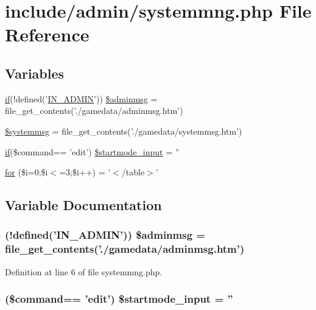 \hypertarget{systemmng_8php}{\section{include/admin/systemmng.php File Reference}
\label{systemmng_8php}
}
\subsection*{Variables}
\begin{DoxyCompactItemize}
\item 
\hyperlink{login__old_8php_a4ac1118c2e44c513a674bc1793ba6c90}{if}(!defined('\hyperlink{admin_8php_ad49472b0cdee543164375bf133a537f1}{I\+N\+\_\+\+A\+D\+M\+I\+N}')) \hyperlink{systemmng_8php_acbaa51d4f67e40d7ab6d6996ec22873c}{\$adminmsg} = file\+\_\+get\+\_\+contents('./gamedata/adminmsg.\+htm')
\item 
\hyperlink{systemmng_8php_a55ca8f809e3f66df41dedfdc9e85649e}{\$systemmsg} = file\+\_\+get\+\_\+contents('./gamedata/systemmsg.\+htm')
\item 
\hyperlink{login__old_8php_a4ac1118c2e44c513a674bc1793ba6c90}{if}(\$command== 'edit') \hyperlink{systemmng_8php_a87d0410731c4cd806a18505d7dc2fbef}{\$startmode\+\_\+input} = ''
\item 
\hyperlink{systemmng_8php_ac32536c54e0519a86f3c262e8f882bd9}{for} (\$i=0;\$i$<$=3;\$i++) = '$<$/table$>$'
\end{DoxyCompactItemize}


\subsection{Variable Documentation}
\hypertarget{systemmng_8php_acbaa51d4f67e40d7ab6d6996ec22873c}{
\subsubsection[{\$adminmsg}]{ (!defined('{\bf I\+N\+\_\+\+A\+D\+M\+I\+N}')) \$adminmsg = file\+\_\+get\+\_\+contents('./gamedata/adminmsg.\+htm')}}\label{systemmng_8php_acbaa51d4f67e40d7ab6d6996ec22873c}


Definition at line 6 of file systemmng.\+php.

\hypertarget{systemmng_8php_a87d0410731c4cd806a18505d7dc2fbef}{
\subsubsection[{\$startmode\+\_\+input}]{ (\$command== 'edit') \$startmode\+\_\+input = ''}}\label{systemmng_8php_a87d0410731c4cd806a18505d7dc2fbef}



